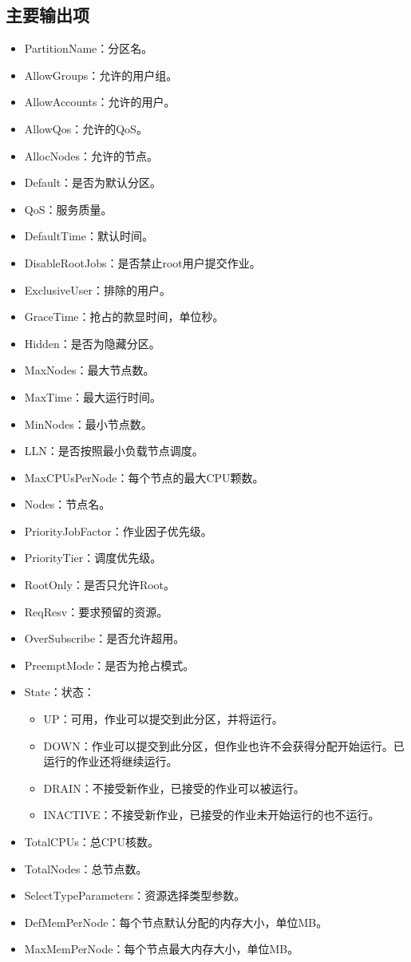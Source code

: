 \subsection{主要输出项}
\begin{itemize}
	\item PartitionName：分区名。
	\item AllowGroups：允许的用户组。
	\item AllowAccounts：允许的用户。
	\item AllowQos：允许的QoS。
	\item AllocNodes：允许的节点。
	\item Default：是否为默认分区。
	\item QoS：服务质量。
	\item DefaultTime：默认时间。
	\item DisableRootJobs：是否禁止root用户提交作业。
	\item ExclusiveUser：排除的用户。
	\item GraceTime：抢占的款显时间，单位秒。
	\item Hidden：是否为隐藏分区。
	\item MaxNodes：最大节点数。
	\item MaxTime：最大运行时间。
	\item MinNodes：最小节点数。
	\item LLN：是否按照最小负载节点调度。
	\item MaxCPUsPerNode：每个节点的最大CPU颗数。
	\item Nodes：节点名。
	\item PriorityJobFactor：作业因子优先级。
	\item PriorityTier：调度优先级。
	\item RootOnly：是否只允许Root。
	\item ReqResv：要求预留的资源。
	\item OverSubscribe：是否允许超用。
	\item PreemptMode：是否为抢占模式。
	\item State：状态：
\begin{itemize}
	\item UP：可用，作业可以提交到此分区，并将运行。
   	\item DOWN：作业可以提交到此分区，但作业也许不会获得分配开始运行。已运行的作业还将继续运行。
   	\item DRAIN：不接受新作业，已接受的作业可以被运行。
   	\item INACTIVE：不接受新作业，已接受的作业未开始运行的也不运行。
\end{itemize}
	\item TotalCPUs：总CPU核数。
	\item TotalNodes：总节点数。
	\item SelectTypeParameters：资源选择类型参数。
	\item DefMemPerNode：每个节点默认分配的内存大小，单位MB。
	\item MaxMemPerNode：每个节点最大内存大小，单位MB。
\end{itemize}

